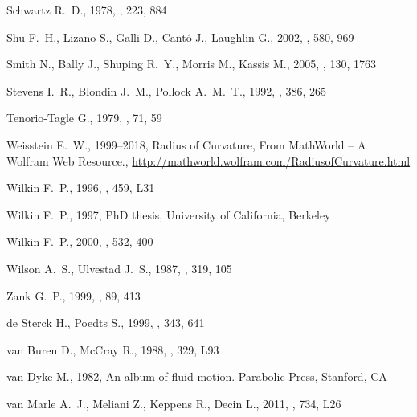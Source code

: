 \documentclass[useAMS, usenatbib, a4paper]{mnras}
\begin{document}
\begin{thebibliography}{}
{Schwartz} R.~D.,  1978, \apj, 223, 884

{Shu} F.~H.,  {Lizano} S.,  {Galli} D.,  {Cant{\'o}} J.,   {Laughlin} G.,
  2002, \apj, 580, 969

{Smith} N.,  {Bally} J.,  {Shuping} R.~Y.,  {Morris} M.,   {Kassis} M.,  2005,
  \aj, 130, 1763

{Stevens} I.~R.,  {Blondin} J.~M.,   {Pollock} A.~M.~T.,  1992, \apj, 386, 265

{Tenorio-Tagle} G.,  1979, \aap, 71, 59

Weisstein E.~W.,  1999--2018, Radius of Curvature, From MathWorld -- A Wolfram
  Web Resource., \url {http://mathworld.wolfram.com/RadiusofCurvature.html}

{Wilkin} F.~P.,  1996, \apjl, 459, L31

{Wilkin} F.~P.,  1997, PhD thesis, University of California, Berkeley

{Wilkin} F.~P.,  2000, \apj, 532, 400

{Wilson} A.~S.,  {Ulvestad} J.~S.,  1987, \apj, 319, 105

{Zank} G.~P.,  1999, \ssr, 89, 413

{de Sterck} H.,  {Poedts} S.,  1999, \aap, 343, 641

{van Buren} D.,  {McCray} R.,  1988, \apjl, 329, L93

{van Dyke} M.,  1982, {An album of fluid motion}.
Parabolic Press, Stanford, CA

{van Marle} A.~J.,  {Meliani} Z.,  {Keppens} R.,   {Decin} L.,  2011, \apjl,
  734, L26

\makeatother
\end{thebibliography}
 
\end{document}

